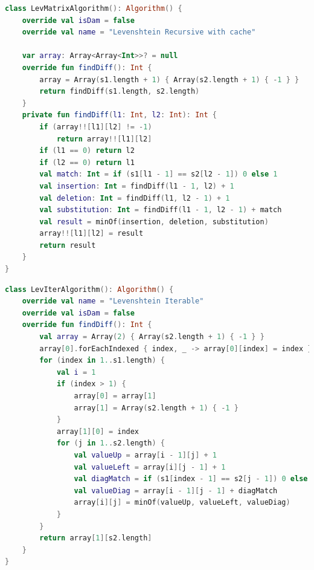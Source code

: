 \documentclass[12pt]{report}
\begin{document}
    \begin{lstlisting}[label={lst:levrecurmatrix},caption=Метод для нахождения расстояния Левенштейна рекурсивно
    \(\text{с матрицей}\),language=kotlin]
class LevMatrixAlgorithm(): Algorithm() {
    override val isDam = false
    override val name = "Levenshtein Recursive with cache"

    var array: Array<Array<Int>>? = null
    override fun findDiff(): Int {
        array = Array(s1.length + 1) { Array(s2.length + 1) { -1 } }
        return findDiff(s1.length, s2.length)
    }
    private fun findDiff(l1: Int, l2: Int): Int {
        if (array!![l1][l2] != -1)
            return array!![l1][l2]
        if (l1 == 0) return l2
        if (l2 == 0) return l1
        val match: Int = if (s1[l1 - 1] == s2[l2 - 1]) 0 else 1
        val insertion: Int = findDiff(l1 - 1, l2) + 1
        val deletion: Int = findDiff(l1, l2 - 1) + 1
        val substitution: Int = findDiff(l1 - 1, l2 - 1) + match
        val result = minOf(insertion, deletion, substitution)
        array!![l1][l2] = result
        return result
    }
}
    \end{lstlisting}

    \begin{lstlisting}[label={lst:levсasualmatrix},caption=Метод для нахождения расстояния Левенштейна итерационно,
        language=kotlin]
class LevIterAlgorithm(): Algorithm() {
    override val name = "Levenshtein Iterable"
    override val isDam = false
    override fun findDiff(): Int {
        val array = Array(2) { Array(s2.length + 1) { -1 } }
        array[0].forEachIndexed { index, _ -> array[0][index] = index }
        for (index in 1..s1.length) {
            val i = 1
            if (index > 1) {
                array[0] = array[1]
                array[1] = Array(s2.length + 1) { -1 }
            }
            array[1][0] = index
            for (j in 1..s2.length) {
                val valueUp = array[i - 1][j] + 1
                val valueLeft = array[i][j - 1] + 1
                val diagMatch = if (s1[index - 1] == s2[j - 1]) 0 else 1
                val valueDiag = array[i - 1][j - 1] + diagMatch
                array[i][j] = minOf(valueUp, valueLeft, valueDiag)
            }
        }
        return array[1][s2.length]
    }
}
    \end{lstlisting}
\end{document}
